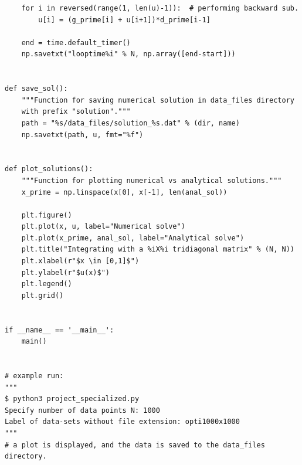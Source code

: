 \documentclass[english,notitlepage]{revtex4-1}  %
\begin{document}
\begin{lstlisting}
    for i in reversed(range(1, len(u)-1)):  # performing backward sub.
        u[i] = (g_prime[i] + u[i+1])*d_prime[i-1]

    end = time.default_timer()
    np.savetxt("looptime%i" % N, np.array([end-start]))


def save_sol():
    """Function for saving numerical solution in data_files directory
    with prefix "solution"."""
    path = "%s/data_files/solution_%s.dat" % (dir, name)
    np.savetxt(path, u, fmt="%f")


def plot_solutions():
    """Function for plotting numerical vs analytical solutions."""
    x_prime = np.linspace(x[0], x[-1], len(anal_sol))

    plt.figure()
    plt.plot(x, u, label="Numerical solve")
    plt.plot(x_prime, anal_sol, label="Analytical solve")
    plt.title("Integrating with a %iX%i tridiagonal matrix" % (N, N))
    plt.xlabel(r"$x \in [0,1]$")
    plt.ylabel(r"$u(x)$")
    plt.legend()
    plt.grid()


if __name__ == '__main__':
    main()


# example run:
"""
$ python3 project_specialized.py
Specify number of data points N: 1000
Label of data-sets without file extension: opti1000x1000
"""
# a plot is displayed, and the data is saved to the data_files directory.

\end{lstlisting}
\end{document}

